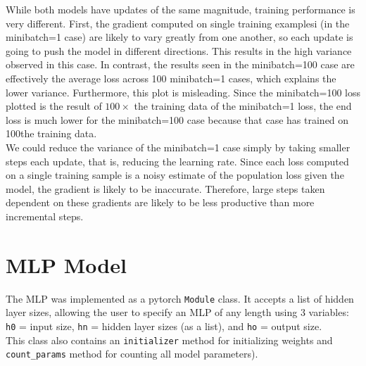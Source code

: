 \documentclass{amsart}
\theoremstyle{definition}
\theoremstyle{remark}
\numberwithin{equation}{section}
\begin{document}
While both models have updates of the same magnitude, training performance is
very different. First, the gradient computed on single training examplesi (in
the minibatch=1 case) are likely to vary greatly from one another, so each
update is going to push the model in different directions. This results in the
high variance observed in this case. In contrast, the results seen in the
minibatch=100 case are effectively the average loss across 100 minibatch=1 cases,
which explains the lower variance. Furthermore, this plot is misleading. Since
the minibatch=100 loss plotted is the result of $100\times$ the training data of
the minibatch=1 loss, the end loss is much lower for the minibatch=100 case
because that case has trained on 100\times the training data. \\

We could reduce the variance of the minibatch=1 case simply by taking smaller
steps each update, that is, reducing the learning rate. Since each loss computed
on a single training sample is a noisy estimate of the population loss given the
model, the gradient is likely to be inaccurate. Therefore, large steps taken
dependent on these gradients are likely to be less productive than more
incremental steps.


\appendix
\section{MLP Model}

The MLP was implemented as a pytorch \texttt{Module} class. It accepts a list of
hidden layer sizes, allowing the user to specify an MLP of any length using 3
variables: \texttt{h0} = input size, \texttt{hn} = hidden layer sizes (as a
list), and \texttt{ho} = output size. \\

This class also contains an \texttt{initializer} method for initializing weights
and \texttt{count\_params} method for counting all model parameters).
\end{document}

